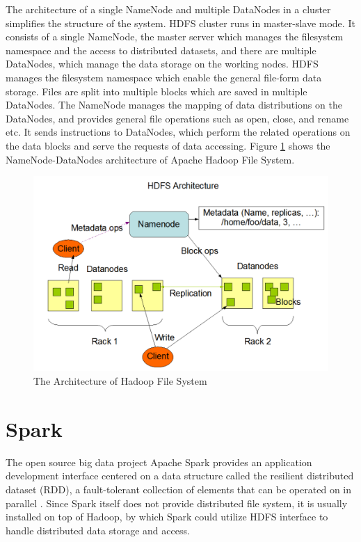 The architecture of a single NameNode and multiple DataNodes in a cluster simplifies the structure of the system. HDFS cluster runs in master-slave mode.  It consists of a single NameNode, the master server which manages the filesystem namespace and the access to distributed datasets, and there are multiple DataNodes, which manage the data storage on the working nodes. HDFS manages the filesystem namespace which enable the general file-form data storage. Files are split into multiple blocks which are saved in multiple DataNodes. The NameNode manages the mapping of data distributions on the DataNodes, and provides general file operations such as open, close, and rename etc. It sends instructions to DataNodes, which perform the related operations on the data blocks and serve the requests of data accessing. Figure \ref{HDFSArch} shows the NameNode-DataNodes architecture of Apache Hadoop File System.

\begin{figure}[h]
\centering
\includegraphics[scale=0.5]{figures/HDFSArch.png}
\caption{The Architecture of Hadoop File System \cite{ApacheHadoop}}
\label{HDFSArch}
\end{figure}

\section{Spark}

The open source big data project Apache Spark provides an application development interface centered on a data structure called the resilient distributed dataset (RDD), a fault-tolerant collection of elements that can be operated on in parallel \cite{ApacheSpark}. Since Spark itself does not provide distributed file system, it is usually installed on top of Hadoop, by which Spark could utilize HDFS interface to handle distributed data storage and access. 

